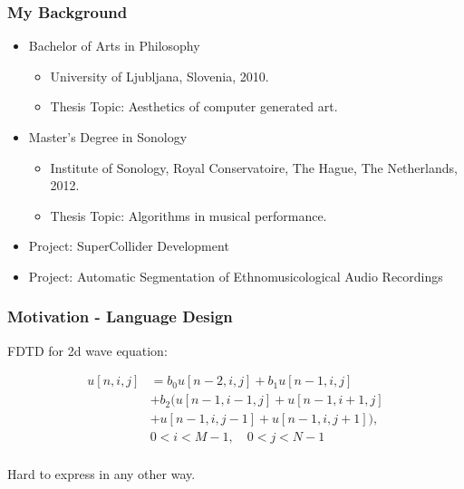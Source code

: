 \documentclass{beamer}
\begin{document}
\begin{frame}
\frametitle{My Background}

\begin{itemize}

\item Bachelor of Arts in Philosophy
    \begin{itemize}
    \item University of Ljubljana, Slovenia, 2010.
    \item Thesis Topic: Aesthetics of computer generated art.
    \end{itemize}

\item Master's Degree in Sonology
    \begin{itemize}
    \item Institute of Sonology, Royal Conservatoire, The Hague, The Netherlands, 2012.
    \item Thesis Topic: Algorithms in musical performance.
    \end{itemize}

\item Project: SuperCollider Development

\item Project: Automatic Segmentation of Ethnomusicological Audio Recordings

\end{itemize}

\end{frame}

\begin{frame}
\frametitle{Motivation - Language Design}

FDTD for 2d wave equation:

\begin{equation}
\label{eq:wave-2d}
\begin{aligned}
u[n,i,j]
    &= b_0 u[n-2,i,j] + b_1 u[n-1,i,j] \\
    &+ b_2 \big(u[n-1,i-1,j] + u[n-1,i+1,j] \\
    &+ u[n-1,i,j-1] + u[n-1,i,j+1]\big), \\
    &0 < i < M-1, \quad 0 < j < N-1\\
\end{aligned}
\end{equation}

Hard to express in any other way.

\end{frame}
\end{document}
